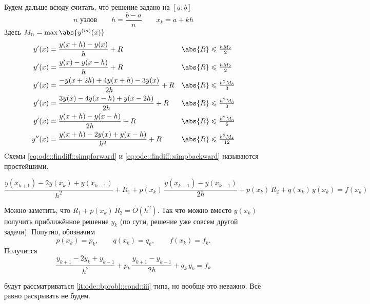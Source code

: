 \documentclass{trlnotes}
\begin{document}
Будем дальше всюду считать, что решение задано на $[a;b]$
\[
  \text{$n$ узлов}\qquad h = \frac{b-a}{n} \qquad x_k = a + kh
\]
Здесь $M_n = \max \abs{y^{(m)}(x)}$
\begin{align}
  \label{eq:ode::findiff::simpforward}
  y'(x) &= \frac{y(x+h) -y (x)}{h} + R & \abs{R} &\leqslant \tfrac{hM_2}{2} \\
  \label{eq:ode::findiff::simpbackward}
  y'(x) &= \frac{y(x) - y (x-h)}{h} + R & \abs{R} &\leqslant \tfrac{hM_2}{2} \\
  \label{eq:ode::findiff::threepointforward}
  y'(x) &= \frac{-y(x+2h) + 4y (x+h) - 3y(x)}{2h} + R & \abs{R} &\leqslant \tfrac{h^2M_3}{3} \\
  \label{eq:ode::findiff::threepointbackward}
  y'(x) &= \frac{3y(x) - 4y (x-h) + y(x-2h)}{2h} + R & \abs{R} &\leqslant \tfrac{h^2M_3}{3} \\
  \label{eq:ode::findiff::simmetric}
  y'(x) &= \frac{y(x+h) - y (x-h)}{2h} + R & \abs{R} &\leqslant \tfrac{h^2M_3}{6} \\
  \label{eq:ode::findiff::simmetricsecondorder}
  y''(x) &= \frac{y(x+h) - 2y (x) + y(x-h)}{h^2} + R & \abs{R} &\leqslant \tfrac{h^2M_4}{12}
\end{align}
Cхемы \ref{eq:ode::findiff::simpforward} и \ref{eq:ode::findiff::simpbackward} называются 
простейшими.


\begin{equation*}
  \frac{y(x_{k+1}) - 2y(x_k) + y(x_{k-1})}{h^2} + R_1 
  + p(x_k) \, \frac{y(x_{k+1}) - y(x_{k-1})}{2h} + p(x_k)\,R_2 
  + q(x_k) \, y(x_k) = f(x_k)
\end{equation*}

Можно заметить, что $R_1 + p(x_k)\, R_2 = O(h^2)$.
Так что можно вместо $y(x_k)$ получить приближённое решение $y_k$
(по сути, решение уже совсем другой задачи). Попутно, обозначим
\[
  p(x_k) = p_k,\qquad q(x_k) = q_k, \qquad f(x_k) = f_k.
\]
Получится
\begin{equation}\label{eq:ode::findiff::diffeq}
  \frac{y_{k+1} - 2y_k + y_{k-1}}{h^2}
  + p_k \, \frac{y_{k+1} - y_{k-1}}{2h} 
  + q_k \, y_k = f_k
\end{equation}

 будут рассматриваться \ref{it:ode::bprobl::cond::iii} типа,
но вообще это неважно. Всё равно раскрывать не будем.
\end{document}
